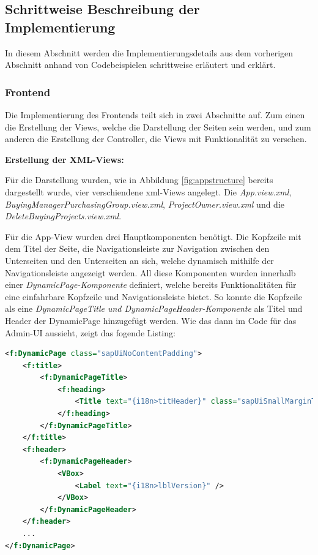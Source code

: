 \subsection[Schrittweise Beschreibung der Implementierung]{Schrittweise Beschreibung der Implementierung}

In diesem Abschnitt werden die Implementierungsdetails aus dem vorherigen Abschnitt anhand von Codebeispielen schrittweise erläutert und erklärt.

\subsubsection{Frontend}
Die Implementierung des Frontends teilt sich in zwei Abschnitte auf. 
Zum einen die Erstellung der Views, welche die Darstellung der Seiten sein werden, und zum anderen die Erstellung der Controller, die Views mit Funktionalität zu versehen. 

\textbf{Erstellung der XML-Views:}

Für die Darstellung wurden, wie in Abbildung \ref{fig:appstructure} bereits dargestellt wurde, vier verschiendene \gls{xml}-Views angelegt.
Die \textit{App.view.xml}, \textit{BuyingManagerPurchasingGroup.view.xml}, \textit{ProjectOwner.view.xml} und die \textit{DeleteBuyingProjects.view.xml}.

Für die App-View wurden drei Hauptkomponenten benötigt.
Die Kopfzeile mit dem Titel der Seite, die Navigationsleiste zur Navigation zwischen den Unterseiten und den Unterseiten an sich, welche dynamisch mithilfe der Navigationsleiste angezeigt werden.
All diese Komponenten wurden innerhalb einer \textit{DynamicPage-Komponente} definiert, welche bereits Funktionalitäten für eine einfahrbare Kopfzeile und Navigationsleiste bietet.
So konnte die Kopfzeile als eine \textit{DynamicPageTitle und DynamicPageHeader-Komponente} als Titel und Header der DynamicPage hinzugefügt werden.
Wie das dann im Code für das Admin-UI aussieht, zeigt das fogende Listing:

\begin{lstlisting}[caption={Kopfzeile des App-Views}, language={XML}]
<f:DynamicPage class="sapUiNoContentPadding">
    <f:title>
        <f:DynamicPageTitle>
            <f:heading>
                <Title text="{i18n>titHeader}" class="sapUiSmallMarginTop" />
            </f:heading>
        </f:DynamicPageTitle>
    </f:title>
    <f:header>
        <f:DynamicPageHeader>
            <VBox>
                <Label text="{i18n>lblVersion}" />
            </VBox>
        </f:DynamicPageHeader>
    </f:header>
    ...
</f:DynamicPage>
\end{lstlisting}

